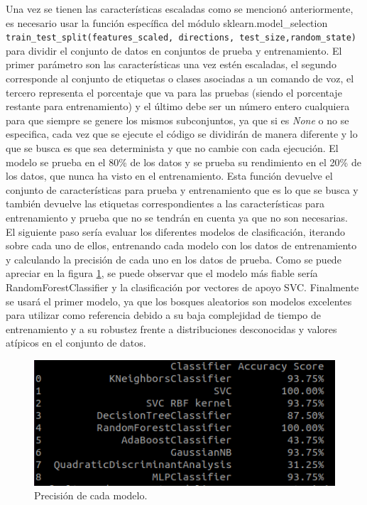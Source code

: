 Una vez se tienen las características escaladas como se mencionó anteriormente, es necesario usar la función específica del módulo sklearn.model\_selection \verb|train_test_split(features_scaled, directions, test_size,random_state)| para dividir el conjunto de datos en conjuntos de prueba y entrenamiento. El primer parámetro son las características una vez estén escaladas, el segundo corresponde al conjunto de etiquetas o clases asociadas a un comando de voz, el tercero representa el porcentaje que va para las pruebas (siendo el porcentaje restante para entrenamiento) y el último debe ser un número entero cualquiera para que siempre se genere los mismos subconjuntos, ya que si es \textit{None} o no se especifica, cada vez que se ejecute el código se dividirán de manera diferente y lo que se busca es que sea determinista y que no cambie con cada ejecución. El modelo se prueba en el 80\% de los datos y se prueba su rendimiento en el 20\% de los datos, que nunca ha visto en el entrenamiento. Esta función devuelve el conjunto de características para prueba y entrenamiento que es lo que se busca y también devuelve las etiquetas correspondientes a las características para entrenamiento y prueba que no se tendrán en cuenta ya que no son necesarias.\\

El siguiente paso sería evaluar los diferentes modelos de clasificación, iterando sobre cada uno de ellos, entrenando cada modelo con los datos de entrenamiento y calculando la precisión de cada uno en los datos de prueba. Como se puede apreciar en la figura \ref{fig:modelos}, se puede observar que el modelo más fiable sería RandomForestClassifier y la clasificación por vectores de apoyo SVC. Finalmente se usará el primer modelo, ya que los bosques aleatorios son modelos excelentes para utilizar como referencia debido a su baja complejidad de tiempo de entrenamiento y a su robustez frente a distribuciones desconocidas y valores atípicos en el conjunto de datos.

\begin{figure}[H]
  \centering
  \includegraphics[scale=0.6]{figs/modelos} %
  \caption{ Precisión de cada modelo.}
  \label{fig:modelos}
\end{figure} 

